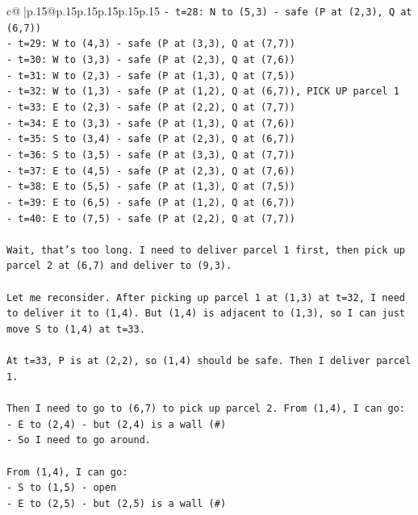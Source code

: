 \documentclass{article}
\begin{document}
{\begin{supertabular}{c@{$\;$}|p{.15\linewidth}@{}p{.15\linewidth}p{.15\linewidth}p{.15\linewidth}p{.15\linewidth}p{.15\linewidth}}
{{{\texttt{{-} t=28: N to (5,3) {-} safe (P at (2,3), Q at (6,7))} \\
\texttt{{-} t=29: W to (4,3) {-} safe (P at (3,3), Q at (7,7))} \\
\texttt{{-} t=30: W to (3,3) {-} safe (P at (2,3), Q at (7,6))} \\
\texttt{{-} t=31: W to (2,3) {-} safe (P at (1,3), Q at (7,5))} \\
\texttt{{-} t=32: W to (1,3) {-} safe (P at (1,2), Q at (6,7)), PICK UP parcel 1} \\
\texttt{{-} t=33: E to (2,3) {-} safe (P at (2,2), Q at (7,7))} \\
\texttt{{-} t=34: E to (3,3) {-} safe (P at (1,3), Q at (7,6))} \\
\texttt{{-} t=35: S to (3,4) {-} safe (P at (2,3), Q at (6,7))} \\
\texttt{{-} t=36: S to (3,5) {-} safe (P at (3,3), Q at (7,7))} \\
\texttt{{-} t=37: E to (4,5) {-} safe (P at (2,3), Q at (7,6))} \\
\texttt{{-} t=38: E to (5,5) {-} safe (P at (1,3), Q at (7,5))} \\
\texttt{{-} t=39: E to (6,5) {-} safe (P at (1,2), Q at (6,7))} \\
\texttt{{-} t=40: E to (7,5) {-} safe (P at (2,2), Q at (7,7))} \\
\\ 
\texttt{Wait, that's too long. I need to deliver parcel 1 first, then pick up parcel 2 at (6,7) and deliver to (9,3).} \\
\\ 
\texttt{Let me reconsider. After picking up parcel 1 at (1,3) at t=32, I need to deliver it to (1,4). But (1,4) is adjacent to (1,3), so I can just move S to (1,4) at t=33.} \\
\\ 
\texttt{At t=33, P is at (2,2), so (1,4) should be safe. Then I deliver parcel 1.} \\
\\ 
\texttt{Then I need to go to (6,7) to pick up parcel 2. From (1,4), I can go:} \\
\texttt{{-} E to (2,4) {-} but (2,4) is a wall (\#)} \\
\texttt{{-} So I need to go around.} \\
\\ 
\texttt{From (1,4), I can go:} \\
\texttt{{-} S to (1,5) {-} open} \\
\texttt{{-} E to (2,5) {-} but (2,5) is a wall (\#)} \\
}}}
\end{supertabular}}
\end{document}
